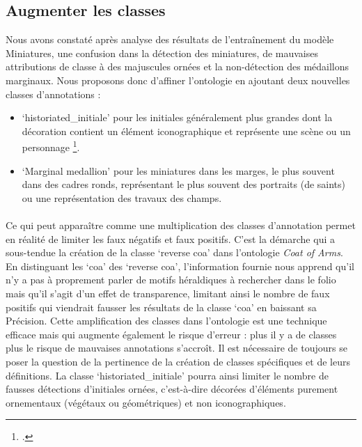 \documentclass[12pt,twoside]{book}
\begin{document}
\subsection{Augmenter les classes}

Nous avons constaté après analyse des résultats de l’entraînement du modèle Miniatures, une confusion dans la détection des miniatures, de mauvaises attributions de classe à des majuscules ornées et la non-détection des médaillons marginaux. Nous proposons donc d’affiner l’ontologie en ajoutant deux nouvelles classes d’annotations : \\
\begin{itemize}
    \item ‘historiated\_initiale’ pour les initiales généralement plus grandes dont la décoration contient un élément iconographique et représente une scène ou un personnage \footcite{boillet_horae_2020}.
    \item ‘Marginal medallion’ pour les miniatures dans les marges, le plus souvent dans des cadres ronds, représentant le plus souvent des portraits (de saints) ou une représentation des travaux des champs. 
\end{itemize}

\paragraph{}
Ce qui peut apparaître comme une multiplication des classes d’annotation permet en réalité de limiter les faux négatifs et faux positifs. C’est la démarche qui a sous-tendue la création de la classe ‘reverse coa’ dans l’ontologie \textit{Coat of Arms}.  En distinguant les ‘coa’ des ‘reverse coa’, l’information fournie nous apprend qu’il n’y a pas à proprement parler de motifs héraldiques à rechercher dans le folio mais qu’il s’agit d’un effet de transparence, limitant ainsi le nombre de faux positifs qui viendrait fausser les résultats de la classe ‘coa’ en baissant sa Précision. Cette amplification des classes dans l’ontologie est une technique efficace mais qui augmente également le risque d’erreur : plus il y a de classes plus le risque de mauvaises annotations s’accroît. Il est nécessaire de toujours se poser la question de la pertinence de la création de classes spécifiques et de leurs définitions. La classe ‘historiated\_initiale’ pourra ainsi limiter le nombre de fausses détections d’initiales ornées, c’est-à-dire décorées d'éléments purement ornementaux (végétaux ou géométriques) et non iconographiques. \\
\end{document}
